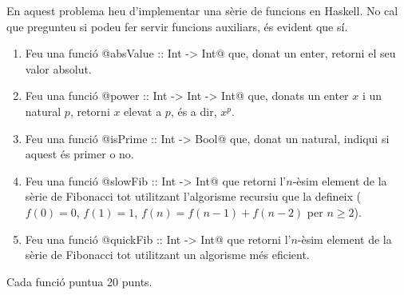 

\UseHaskell

\Statement

En aquest problema heu d’implementar una sèrie de funcions en Haskell.
No cal que pregunteu si podeu fer servir funcions auxiliars, és evident que sí.



\begin{enumerate}

\item Feu una funció @absValue :: Int -> Int@ que,
donat un enter, retorni el seu valor absolut.

\item Feu una funció @power :: Int -> Int -> Int@ que,
donats un enter $x$ i un natural $p$, retorni $x$ elevat a $p$, és a dir, $x^p$.


\item Feu una funció @isPrime :: Int -> Bool@ que,
donat un natural, indiqui si aquest és primer o no.


\item Feu una funció @slowFib :: Int -> Int@ que
retorni l'$n$-èsim element de la sèrie de Fibonacci
tot utilitzant l'algorisme recursiu que la defineix
($f(0)=0$, $f(1)=1$, $f(n)=f(n-1)+f(n-2)$ per $n\ge 2$).


\item Feu una funció @quickFib :: Int -> Int@ que
retorni l'$n$-èsim element de la sèrie de Fibonacci
tot utilitzant un algorisme més eficient.


\end{enumerate}

\Scoring

Cada funció puntua 20 punts.

\SampleOneCol
